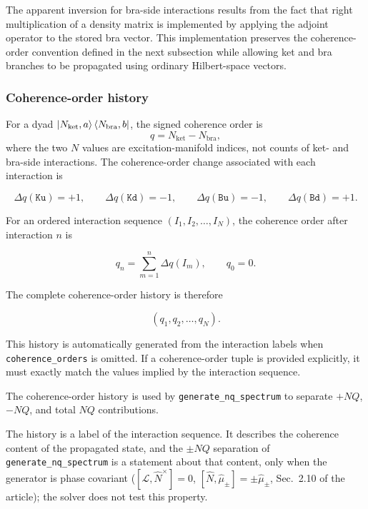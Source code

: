 \documentclass[11pt]{article}
\newcommand{\ArtSecScope}{2.10}        %
\begin{document}
The apparent inversion for bra-side interactions results from the fact that right multiplication of a density matrix is implemented by applying the adjoint operator to the stored bra vector. This implementation preserves the coherence-order convention defined in the next subsection while allowing ket and bra branches to be propagated using ordinary Hilbert-space vectors.


\subsubsection{Coherence-order history}

For a dyad $\ket{N_{\mathrm{ket}},a}\bra{N_{\mathrm{bra}},b}$, the signed coherence order is
\begin{equation}
q=N_{\mathrm{ket}}-N_{\mathrm{bra}},
\end{equation}
where the two $N$ values are excitation-manifold indices, not counts of ket- and bra-side interactions. The coherence-order change associated with each interaction is

\begin{equation}
\Delta q(\texttt{Ku})=+1, \qquad \Delta q(\texttt{Kd})=-1, \qquad \Delta q(\texttt{Bu})=-1, \qquad \Delta q(\texttt{Bd})=+1.
\end{equation}

For an ordered interaction sequence \((I_1,I_2,\ldots,I_N)\), the coherence order after interaction \(n\) is

\begin{equation}
q_n=\sum_{m=1}^{n}\Delta q(I_m),\qquad q_0=0.
\end{equation}

The complete coherence-order history is therefore

\begin{equation}
(q_1,q_2,\ldots,q_N).
\end{equation}

This history is automatically generated from the interaction labels when \texttt{coherence\_orders} is omitted. If a coherence-order tuple is provided explicitly, it must exactly match the values implied by the interaction sequence.

The coherence-order history is used by \texttt{generate\_nq\_spectrum} to separate \(+NQ\), \(-NQ\), and total \(NQ\) contributions.

The history is a label of the interaction sequence. It describes the coherence content of the propagated state, and the \(\pm NQ\) separation of \texttt{generate\_nq\_spectrum} is a statement about that content, only when the generator is phase covariant (\([\mathcal{L},\hat N^{\times}]=0\), \([\hat N,\hat\mu_\pm]=\pm\hat\mu_\pm\), Sec.~\ArtSecScope{} of the article); the solver does not test this property.
\end{document}
